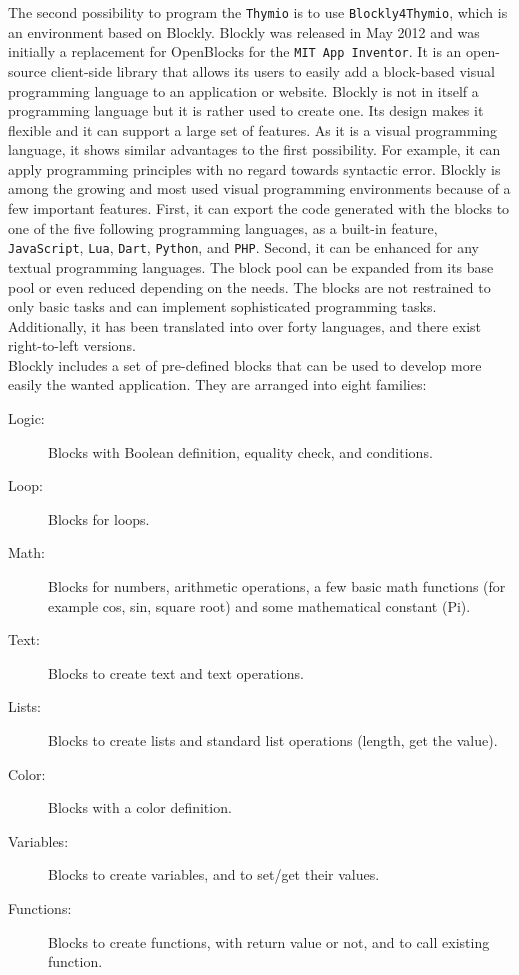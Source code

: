 \documentclass{scrreprt}
\begin{document}
The second possibility to program the \texttt{Thymio} is to use \texttt{Blockly4Thymio}, which is an environment based on Blockly. Blockly was released in May 2012 and was initially a replacement for OpenBlocks for the \texttt{MIT App Inventor}. 
It is an open-source client-side library that allows its users to easily add a block-based visual programming language to an application or website. 
Blockly is not in itself a programming language but it is rather used to create one. Its design makes it flexible and it can support a large set of features. 
As it is a visual programming language, it shows similar advantages to the first possibility. For example, it can apply programming principles with no regard towards syntactic error.
Blockly is among the growing and most used visual programming environments because of a few important features. First, it can export the code generated with the blocks to one of the five following programming languages, 
as a built-in feature, \texttt{JavaScript}, \texttt{Lua}, \texttt{Dart}, \texttt{Python}, and \texttt{PHP}. Second, it can be enhanced for any textual programming languages. 
The block pool can be expanded from its base pool or even reduced depending on the needs. The blocks are not restrained to only basic tasks and can implement sophisticated programming tasks. 
Additionally, it has been translated into over forty languages, and there exist right-to-left versions. \\

Blockly includes a set of pre-defined blocks that can be used to develop more easily the wanted application. They are arranged into eight families:
\begin{description}
  \item [Logic:] Blocks with Boolean definition, equality check, and conditions.
  \item [Loop:] Blocks for loops.
  \item [Math:] Blocks for numbers, arithmetic operations, a few basic math functions (for example cos, sin, square root) and some mathematical constant (Pi).
  \item [Text:] Blocks to create text and text operations.
  \item [Lists:] Blocks to create lists and standard list operations (length, get the value).
  \item [Color:] Blocks with a color definition.
  \item [Variables:] Blocks to create variables, and to set/get their values.
  \item [Functions:] Blocks to create functions, with return value or not, and to call existing function.
\end{description}
\end{document}
